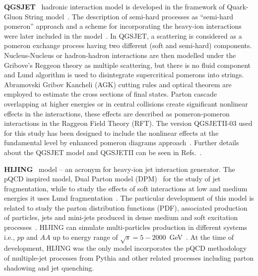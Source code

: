 \documentclass{article}
\begin{document}
{ \bf QGSJET}~\cite{Ostapchenko:2007qb} hadronic interaction model is developed in the framework of Quark-Gluon String model~\cite{Engel:2011zzb}. The description of semi-hard processes as “semi-hard pomeron” approach and a scheme for incorporating the heavy-ion interactions were later included in the model~\cite{Kalmykov:1993qe}. In QGSJET, a scattering is considered as a pomeron exchange process having two different (soft and semi-hard) components. Nucleus-Nucleus or hadron-hadron interactions are then modelled under the Gribove’s Reggeon theory as multiple scattering, but there is no fluid component and Lund algorithm is used to disintegrate supercritical pomerons into strings. Abramovski Gribov Kancheli (AGK) cutting rules and optical theorem are employed to estimate the cross sections of final states. Parton cascade overlapping at higher energies or in central collisions create significant nonlinear effects in the interactions, these effects are described as pomeron-pomeron interactions in the Raggeon Field Theory (RFT). The version QGSJETII-03 used for this study has been designed to include the nonlinear effects at the fundamental level by enhanced pomeron diagrams approach~\cite{Ostapchenko:2004ss}. Further details about the QGSJET model and QGSJETII can be seen in Refs.~\cite{Ostapchenko:2007qb, Ostapchenko:2004ss, Engel:2011zzb, Kalmykov:1993qe}.


{\bf HIJING}~\cite{Wang:1991hta} model -- an acronym for heavy-ion jet interaction generator. The pQCD inspired model, Dual Parton model (DPM)~\cite{Capella:1979fm} for the study of jet fragmentation, while to study the effects of soft interactions at low and medium energies it uses Lund fragmentation~\cite{Andersson:2001yu}. The particular development of this model is related to study the parton distribution functions (PDF), associated production of particles, jets and mini-jets produced in dense medium and soft excitation processes~\cite{Wang:1991hta}. HIJING can simulate multi-particles production in different systems i.e., $pp$ and $AA$ up to energy range of $\sqrt{s}= 5-2000 $~GeV~\cite{Capella:1979fm, Wang:1991hta}. At the time of development, HIJING was the only model incorporates the pQCD methodology of multiple-jet processes from Pythia and other related processes including parton shadowing and jet quenching.  
\end{document}
